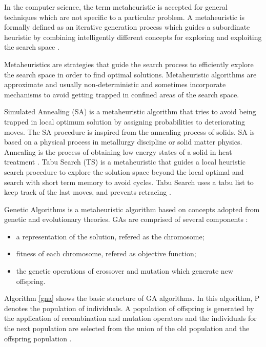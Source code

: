 \documentclass{bmcart}
\begin{document}
In the computer science, the term metaheuristic is accepted for general techniques which are not specific to a particular problem. A metaheuristic is formally defined as an iterative generation process which guides a subordinate heuristic by combining intelligently different concepts for exploring and exploiting the search space \citep{raidl2010metaheuristic}. 

Metaheuristics are strategies that guide the search process to efficiently explore the search space in order to find optimal solutions. Metaheuristic algorithms are approximate and usually non-deterministic and sometimes incorporate mechanisms to avoid getting trapped in confined areas of the search space. 

Simulated Annealing (SA) is a metaheuristic algorithm that tries to avoid being trapped in local optimum solution by assigning probabilities to deteriorating moves. The SA procedure is inspired from the annealing process of solids. SA is based on a physical
process in metallurgy discipline or solid matter physics. Annealing is the process of obtaining low energy states of a solid in heat treatment \citep{Jaziri2008}. Tabu Search (TS) is a metaheuristic that guides a local heuristic search procedure to explore the solution space beyond the local optimal and search with short term memory to avoid cycles. Tabu Search uses a  tabu list to keep track of the last  moves, and prevents retracing \citep{Glover1986}.

Genetic Algorithms is a metaheuristic algorithm based on concepts adopted from genetic and evolutionary theories. GAs are comprised of several components \citep{hong2000simultaneously} \citep{shousha2003performance} :

\begin{itemize}
\item a representation of the solution, refered as the chromosome;
\item fitness of each chromosome, refered as objective function;
\item the genetic operations of crossover and mutation which generate new offspring. 
\end{itemize}


Algorithm \ref{gna} shows the basic structure of GA algorithms. In this algorithm, P denotes the population of individuals. A population of offspring is generated by the application of recombination and mutation operators and the individuals for the next population are selected from the union of the old population and the offspring population \citep{raidl2010metaheuristic}.
\end{document}
